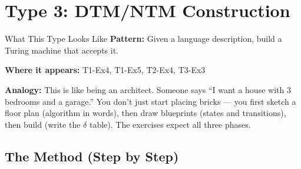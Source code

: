 \documentclass[11pt,a4paper]{article}
\begin{document}
\newpage
\section{Type 3: DTM/NTM Construction}

\begin{notebox}{What This Type Looks Like}
\textbf{Pattern:} Given a language description, build a Turing machine that accepts it.

\textbf{Where it appears:} T1-Ex4, T1-Ex5, T2-Ex4, T3-Ex3

\textbf{Analogy:} This is like being an architect. Someone says ``I want a house with 3 bedrooms and a garage.'' You don't just start placing bricks --- you first sketch a floor plan (algorithm in words), then draw blueprints (states and transitions), then build (write the $\delta$ table). The exercises expect all three phases.
\end{notebox}

\subsection{The Method (Step by Step)}
\end{document}
